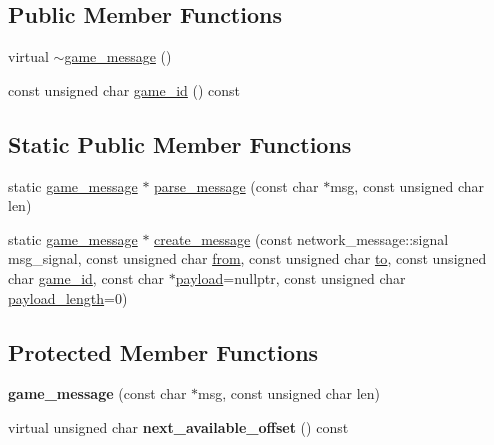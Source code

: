 \subsection*{Public Member Functions}
\begin{DoxyCompactItemize}
\item 
virtual \hyperlink{classbattleship_1_1network__message_1_1game__message_ab3ceb7bc3b5fae4b4cf4ebd96fd6110f}{$\sim$game\+\_\+message} ()
\item 
const unsigned char \hyperlink{classbattleship_1_1network__message_1_1game__message_af64b2d72181dd2444616980c67d43581}{game\+\_\+id} () const
\end{DoxyCompactItemize}
\subsection*{Static Public Member Functions}
\begin{DoxyCompactItemize}
\item 
static \hyperlink{classbattleship_1_1network__message_1_1game__message}{game\+\_\+message} $\ast$ \hyperlink{classbattleship_1_1network__message_1_1game__message_a75f29d2d7fddfe52eb7755857a61aec6}{parse\+\_\+message} (const char $\ast$msg, const unsigned char len)
\item 
static \hyperlink{classbattleship_1_1network__message_1_1game__message}{game\+\_\+message} $\ast$ \hyperlink{classbattleship_1_1network__message_1_1game__message_aa1694088084ed2b07b6c06ba9fb2cb03}{create\+\_\+message} (const network\+\_\+message\+::signal msg\+\_\+signal, const unsigned char \hyperlink{classbattleship_1_1network__message_1_1message_af2ebed25f82de46c947a2241c6952563}{from}, const unsigned char \hyperlink{classbattleship_1_1network__message_1_1message_a36145cf7dfc9102da280adfad5d1a972}{to}, const unsigned char \hyperlink{classbattleship_1_1network__message_1_1game__message_af64b2d72181dd2444616980c67d43581}{game\+\_\+id}, const char $\ast$\hyperlink{classbattleship_1_1network__message_1_1message_ab42ddf52012135284f65641702459912}{payload}=nullptr, const unsigned char \hyperlink{classbattleship_1_1network__message_1_1message_ac4a236888d40ffbdd8572660a3f34b1e}{payload\+\_\+length}=0)
\end{DoxyCompactItemize}
\subsection*{Protected Member Functions}
\begin{DoxyCompactItemize}
\item 
\mbox{\label{classbattleship_1_1network__message_1_1game__message_ae79588b4a84657987030ec8903b70338}} 
{\bfseries game\+\_\+message} (const char $\ast$msg, const unsigned char len)
\item 
\mbox{\label{classbattleship_1_1network__message_1_1game__message_a6ec5d82b622c47f37ac0e81507eb7bdd}} 
virtual unsigned char {\bfseries next\+\_\+available\+\_\+offset} () const
\end{DoxyCompactItemize}
